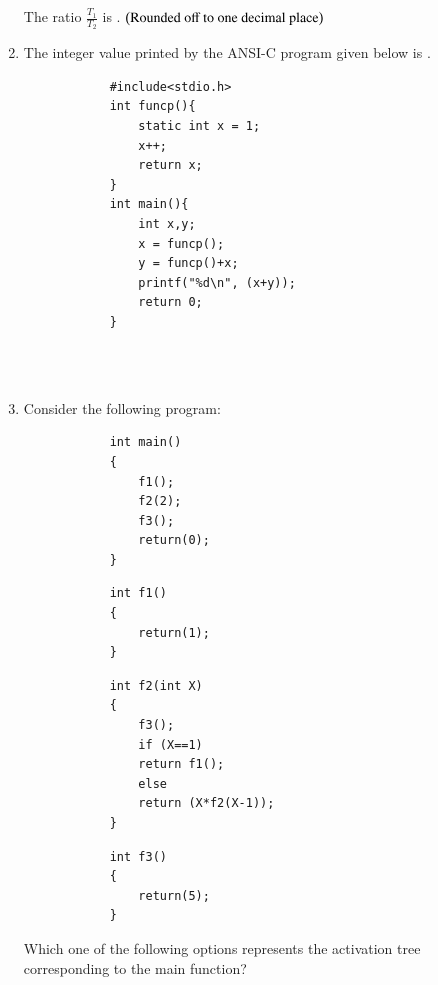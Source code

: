 \documentclass[journal,12pt,onecolumn]{IEEEtran}
\theoremstyle{remark}
\begin{document}
\begin{enumerate}
		The ratio $\frac{T_1}{T_2}$ is \underline{\hspace{2cm}}. $\left(\text{Rounded off to one decimal place}\right)$
		
		\hfill{}
		
		\item The integer value printed by the ANSI-C program given below is \underline{\hspace{2cm}}.
		
		\begin{verbatim}
			#include<stdio.h>
			int funcp(){
				static int x = 1;
				x++;
				return x;
			}
			int main(){
				int x,y;
				x = funcp();
				y = funcp()+x;
				printf("%d\n", (x+y));
				return 0;
			}
		\end{verbatim}
		
		\hfill{}\\
		\\
		\item Consider the following program:
		
		\begin{verbatim}
			int main()
			{
				f1();
				f2(2);
				f3();
				return(0);
			}
					\end{verbatim}
					\underline{\hspace{9cm}}
					\begin{verbatim}
			int f1()
			{
				return(1);
			}
					\end{verbatim}
					\underline{\hspace{9cm}}
							\begin{verbatim}
			int f2(int X)
			{
				f3();
				if (X==1)
				return f1();
				else
				return (X*f2(X-1));
			}
					\end{verbatim}
					\underline{\hspace{9cm}}
							\begin{verbatim}
			int f3()
			{
				return(5);
			}
		\end{verbatim}
		
		Which one of the following options represents the activation tree corresponding to the main function?
		

\end{enumerate}
\end{document}
